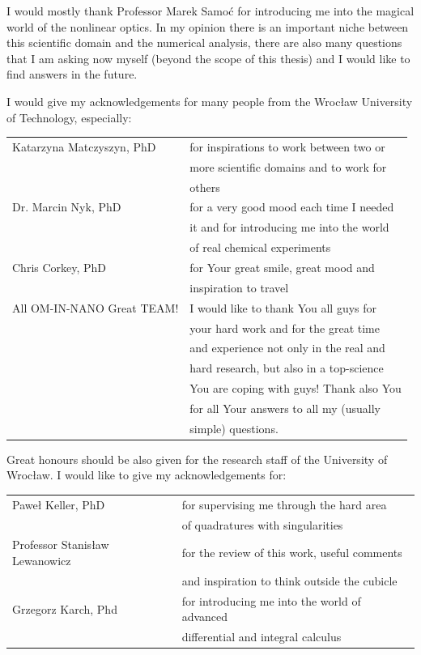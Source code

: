 \documentclass[12pt,twoside,a4paper]{article}
\numberwithin{equation}{subsection}
\numberwithin{figure}{subsection}
\begin{document}
I would mostly thank Professor Marek Samoć for introducing me into the magical world of the nonlinear optics. In my opinion there is an important niche between this scientific domain and the numerical analysis, there are also many questions that I am asking now myself (beyond the scope of this thesis) and I would like to find answers in the future.


I would give my acknowledgements for many people from the Wrocław University of Technology, especially:


\begin{tabular}{l l}
	Katarzyna Matczyszyn, PhD  & for inspirations to work between two or \\
	                           & more scientific domains and to work for \\ 
	                           & others \\ 
	Dr. Marcin Nyk, PhD        & for a very good mood each time I needed \\
	                           & it and for introducing me into the world \\
	                           & of real chemical experiments \\
	Chris Corkey, PhD          & for Your great smile, great mood and \\
	                           & inspiration to travel \\
	All OM-IN-NANO Great TEAM! & I would like to thank You all guys for \\ 
	                           & your hard work and for the great time \\
	                           & and experience not only in the real and \\
	                           & hard research, but also in a top-science \\
	                           & You are coping with guys! Thank also You \\
	                           & for all Your answers to all my (usually \\
	                           & simple) questions. \\
\end{tabular}


Great honours should be also given for the research staff of the University of Wrocław. I would like to give my acknowledgements for:


\begin{tabular}{l l}
    Paweł Keller, PhD              & for supervising me through the hard area \\
                                   & of quadratures with singularities \\ 
    Professor Stanisław Lewanowicz & for the review of this work, useful comments \\
    							   & and inspiration to think outside the cubicle \\
    Grzegorz Karch, Phd            & for introducing me into the world of advanced \\
                                   & differential and integral calculus \\
\end{tabular}
\end{document}

